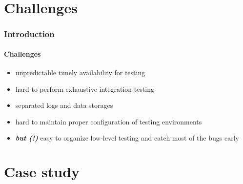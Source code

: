 \documentclass{beamer}
\begin{document}
\section{Challenges}
\begin{frame}
	\frametitle{Introduction}	
	\framesubtitle{Challenges}


	\begin{itemize}
		\item unpredictable timely availability for testing
		\item hard to perform exhaustive integration testing
		\item separated logs and data storages
		\item hard to maintain proper configuration of testing environments
		\item \textbf{\textit{but (!)}} easy to organize low-level testing and catch most of the bugs early
	\end{itemize}
\end{frame}


\section{Case study}


\end{document}
